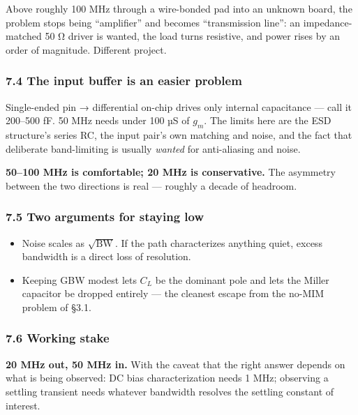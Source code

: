\documentclass[
  10pt,
  a4paper,
]{article}
\providecommand{\tightlist}{%
  \setlength{\itemsep}{0pt}\setlength{\parskip}{0pt}}
\begin{document}
Above roughly 100 MHz through a wire-bonded pad into an unknown board,
the problem stops being ``amplifier'' and becomes ``transmission line'':
an impedance-matched 50 Ω driver is wanted, the load turns resistive,
and power rises by an order of magnitude. Different project.

\hypertarget{the-input-buffer-is-an-easier-problem}{%
\subsubsection{7.4 The input buffer is an easier
problem}\label{the-input-buffer-is-an-easier-problem}}

Single-ended pin → differential on-chip drives only internal capacitance
--- call it 200--500 fF. 50 MHz needs under 100 µS of \(g_m\). The
limits here are the ESD structure's series RC, the input pair's own
matching and noise, and the fact that deliberate band-limiting is
usually \emph{wanted} for anti-aliasing and noise.

\textbf{50--100 MHz is comfortable; 20 MHz is conservative.} The
asymmetry between the two directions is real --- roughly a decade of
headroom.

\hypertarget{two-arguments-for-staying-low}{%
\subsubsection{7.5 Two arguments for staying
low}\label{two-arguments-for-staying-low}}

\begin{itemize}
\tightlist
\item
  Noise scales as \(\sqrt{\mathrm{BW}}\). If the path characterizes
  anything quiet, excess bandwidth is a direct loss of resolution.
\item
  Keeping GBW modest lets \(C_L\) be the dominant pole and lets the
  Miller capacitor be dropped entirely --- the cleanest escape from the
  no-MIM problem of §3.1.
\end{itemize}

\hypertarget{working-stake}{%
\subsubsection{7.6 Working stake}\label{working-stake}}

\textbf{20 MHz out, 50 MHz in.} With the caveat that the right answer
depends on what is being observed: DC bias characterization needs 1 MHz;
observing a settling transient needs whatever bandwidth resolves the
settling constant of interest.
\end{document}
